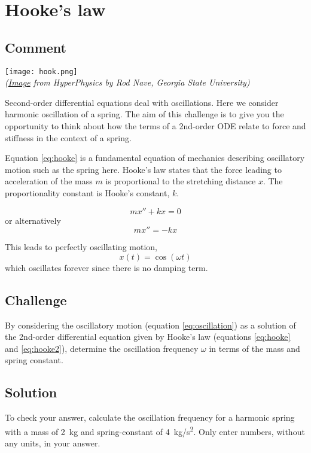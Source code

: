 \section{Hooke's law}
\label{sec:hooke}

\subsection*{Comment}

\texttt{[image: hook.png]}\\
\emph{(\href{http://hyperphysics.phy-astr.gsu.edu/hbase/imgmec/hook.gif}{Image} from HyperPhysics by Rod Nave, Georgia State University)}

Second-order differential equations deal with oscillations. Here we consider harmonic oscillation of a spring. The aim of this challenge is to give you the opportunity to think about how the terms of a 2nd-order ODE relate to force and stiffness in the context of a spring.

Equation \ref{eq:hooke} is a fundamental equation of mechanics describing oscillatory motion such as the spring here. Hooke's law states that the force leading to acceleration of the mass $m$ is proportional to the stretching distance $x$. The proportionality constant is Hooke's constant, $k$.

\begin{equation}
    \label{eq:hooke}
    m x'' + k x = 0
\end{equation}
or alternatively
\begin{equation}
    \label{eq:hooke2}
    m x'' = -k x
\end{equation}

This leads to perfectly oscillating motion,
\begin{equation}
    \label{eq:oscillation}
     x(t)=\cos(\omega t)
\end{equation}
which oscillates forever since there is no damping term.

\subsection*{Challenge}
By considering the oscillatory motion (equation \ref{eq:oscillation}) as a solution of the 2nd-order differential equation given by Hooke's law (equations \ref{eq:hooke} and \ref{eq:hooke2}), determine the oscillation frequency $\omega$ in terms of the mass and spring constant.

\subsection*{Solution}
To check your answer, calculate the oscillation frequency for a harmonic spring with a mass of \SI{2}{kg} and spring-constant of \SI{4}{kg/s^2}. Only enter numbers, without any units, in your answer.


